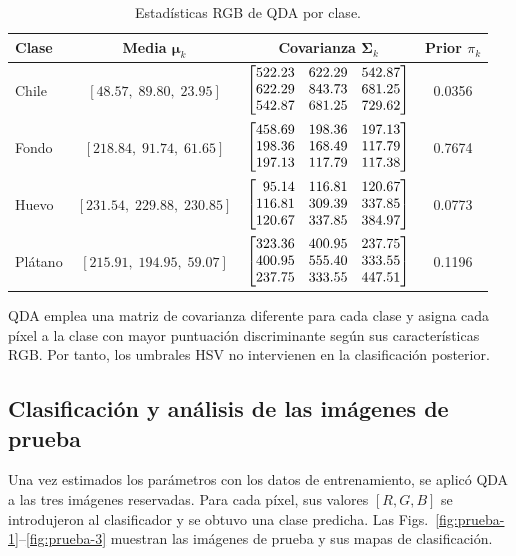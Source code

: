 \documentclass[conference]{IEEEtran}
\begin{document}
\begin{table}[!ht]
\centering
\caption{Estadísticas RGB de QDA por clase.}
\label{tab:qda-parametros}
\scriptsize
\setlength{\tabcolsep}{2pt}
\setlength{\arraycolsep}{1pt}
\renewcommand{\arraystretch}{1.15}
\begin{tabular}{l c c c}
\toprule
Clase & Media $\boldsymbol{\mu}_k$ & Covarianza $\boldsymbol{\Sigma}_k$ & Prior $\pi_k$ \\
\midrule
Chile & $[48.57,\;89.80,\;23.95]$ & $\left[\begin{array}{@{}rrr@{}}522.23&622.29&542.87\\622.29&843.73&681.25\\542.87&681.25&729.62\end{array}\right]$ & 0.0356 \\
\midrule
Fondo & $[218.84,\;91.74,\;61.65]$ & $\left[\begin{array}{@{}rrr@{}}458.69&198.36&197.13\\198.36&168.49&117.79\\197.13&117.79&117.38\end{array}\right]$ & 0.7674 \\
\midrule
Huevo & $[231.54,\;229.88,\;230.85]$ & $\left[\begin{array}{@{}rrr@{}}95.14&116.81&120.67\\116.81&309.39&337.85\\120.67&337.85&384.97\end{array}\right]$ & 0.0773 \\
\midrule
Plátano & $[215.91,\;194.95,\;59.07]$ & $\left[\begin{array}{@{}rrr@{}}323.36&400.95&237.75\\400.95&555.40&333.55\\237.75&333.55&447.51\end{array}\right]$ & 0.1196 \\
\bottomrule
\end{tabular}
\end{table}

QDA emplea una matriz de covarianza diferente para cada clase y asigna cada píxel a la clase con mayor puntuación discriminante según sus características RGB. Por tanto, los umbrales HSV no intervienen en la clasificación posterior.

\subsection{Clasificación y análisis de las imágenes de prueba}
Una vez estimados los parámetros con los datos de entrenamiento, se aplicó QDA a las tres imágenes reservadas. Para cada píxel, sus valores $[R,G,B]$ se introdujeron al clasificador y se obtuvo una clase predicha. Las Figs.~\ref{fig:prueba-1}--\ref{fig:prueba-3} muestran las imágenes de prueba y sus mapas de clasificación.
\end{document}
